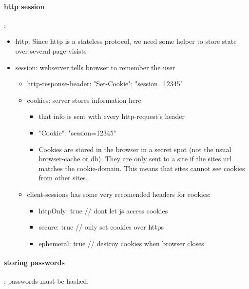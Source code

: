 \paragraph{http session}:
\begin{itemize}
     \item http: Since http is a stateless protocol, we need some helper to store state over several page-visists
     \item session: webserver tells browser to remember the user \begin{itemize}
          \item http-response-header: "Set-Cookie": "session=12345"
          \item cookies:  server stores information here \begin{itemize}
               \item that info is sent with every http-request's header
               \item "Cookie": "session=12345"
               \item Cookies are stored in the browser in a secret spot (not the usual browser-cache or db). They are only sent to a site if the sites url matches the cookie-domain. This means that sites cannot see cookies from other sites.
          \end{itemize}
          \item client-sessions has some very recomended headers for cookies: \begin{itemize}
               \item httpOnly: true // dont let js access cookies
               \item secure: true // only set cookies over https
               \item ephemeral: true // destroy cookies when browser closes
          \end{itemize}
     \end{itemize}
\end{itemize}

\paragraph{storing passwords}:
    passwords must be hashed.


